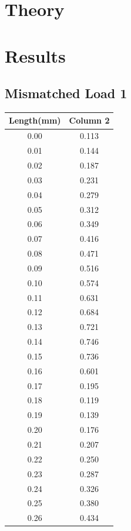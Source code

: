 \documentclass{report}
\begin{document}
    \chapter{Theory}
    \chapter{Results}
    
    \section{Mismatched Load 1}
    \begin{multicols}{2}
    \begin{table}[H]
        \centering
        \begin{tabular}{cc}
        \hline
        Length(mm) & Column 2 \\
        \hline
        0.00 & 0.113 \\
        0.01 & 0.144 \\
        0.02 & 0.187 \\
        0.03 & 0.231 \\
        0.04 & 0.279 \\
        0.05 & 0.312 \\
        0.06 & 0.349 \\
        0.07 & 0.416 \\
        0.08 & 0.471 \\
        0.09 & 0.516 \\
        0.10 & 0.574 \\
        0.11 & 0.631 \\
        0.12 & 0.684 \\
        0.13 & 0.721 \\
        0.14 & 0.746 \\
        0.15 & 0.736 \\
        0.16 & 0.601 \\
        0.17 & 0.195 \\
        0.18 & 0.119 \\
        0.19 & 0.139 \\
        0.20 & 0.176 \\
        0.21 & 0.207 \\
        0.22 & 0.250 \\
        0.23 & 0.287 \\
        0.24 & 0.326 \\
        0.25 & 0.380 \\
        0.26 & 0.434 \\

\end{tabular}
\end{table}
\end{multicols}
\end{document}
